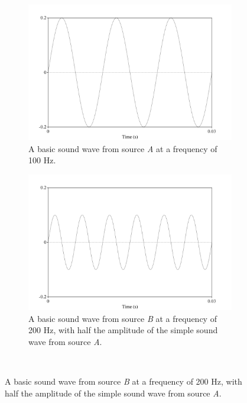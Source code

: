 \DIFdelbegin %
\DIFdelend \DIFaddbegin \begin{figure}[H]
\DIFaddendFL \begin{subfigure}{0.5\textwidth}
  \includegraphics[width=\textwidth]{figure/basic-sound-wave.png}
  \caption{A basic sound wave from source \textit{A} at a frequency of 100 Hz.}
  \label{fig:sound-wave-A}
\end{subfigure}
\qquad
\begin{subfigure}{0.5\textwidth}
  \includegraphics[width=\textwidth]{figure/sound-wave-addition-200hz.png}
  \caption{A basic sound wave from source \textit{B} at a frequency of 200 Hz, with half the amplitude of the simple sound wave from source \textit{A}.}
  \label{fig:sound-wave-B}
\end{subfigure}
%
\\[2ex]

\end{figure}
